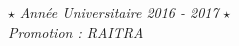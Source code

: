 \documentclass[12pt,a4paper]{report}
\begin{document}
\begin{titlepage}
 	\parbox{\textwidth}{
 		\begin{center}
 			$\star$
 			\centering\textit{Année Universitaire 2016 - 2017} $\star$ \\
 			\centering\textit{Promotion : RAITRA}
 		\end{center}
 	}
 \end{titlepage}

\restoregeometry 
\end{document}
